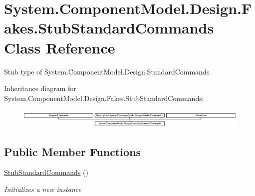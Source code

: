 \hypertarget{class_system_1_1_component_model_1_1_design_1_1_fakes_1_1_stub_standard_commands}{\section{System.\-Component\-Model.\-Design.\-Fakes.\-Stub\-Standard\-Commands Class Reference}
\label{class_system_1_1_component_model_1_1_design_1_1_fakes_1_1_stub_standard_commands}
}


Stub type of System.\-Component\-Model.\-Design.\-Standard\-Commands 


Inheritance diagram for System.\-Component\-Model.\-Design.\-Fakes.\-Stub\-Standard\-Commands\-:\begin{figure}[H]
\begin{center}
\leavevmode
\includegraphics[height=0.908354cm]{class_system_1_1_component_model_1_1_design_1_1_fakes_1_1_stub_standard_commands}
\end{center}
\end{figure}
\subsection*{Public Member Functions}
\begin{DoxyCompactItemize}
\item 
\hyperlink{class_system_1_1_component_model_1_1_design_1_1_fakes_1_1_stub_standard_commands_aa1ddc0702a18e848f12e92ae377e4e66}{Stub\-Standard\-Commands} ()
\begin{DoxyCompactList}\small\item\em Initializes a new instance\end{DoxyCompactList}\end{DoxyCompactItemize}
